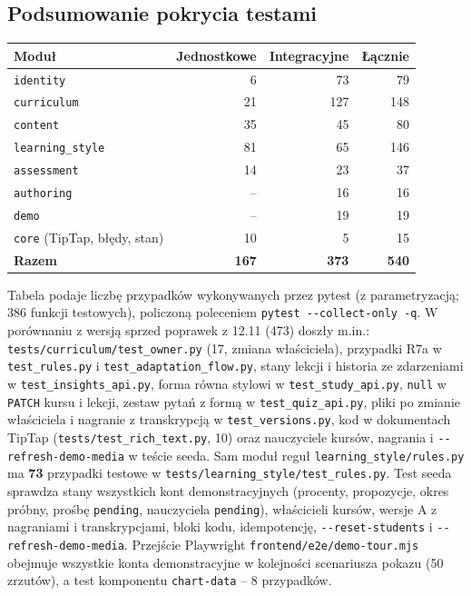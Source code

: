 \subsection{Podsumowanie pokrycia testami}

\begin{center}
\begin{tabular}{lrrr}
\toprule
\textbf{Moduł} & \textbf{Jednostkowe} & \textbf{Integracyjne} & \textbf{Łącznie} \\
\midrule
\texttt{identity}        & 6   & 73  & 79 \\
\texttt{curriculum}      & 21  & 127 & 148 \\
\texttt{content}         & 35  & 45  & 80 \\
\texttt{learning\_style} & 81  & 65  & 146 \\
\texttt{assessment}      & 14  & 23  & 37 \\
\texttt{authoring}       & --  & 16  & 16 \\
\texttt{demo}            & --  & 19  & 19 \\
\texttt{core} (TipTap, błędy, stan) & 10 & 5 & 15 \\
\midrule
\textbf{Razem}           & \textbf{167} & \textbf{373} & \textbf{540} \\
\bottomrule
\end{tabular}
\end{center}

Tabela podaje liczbę przypadków wykonywanych przez pytest (z parametryzacją; 386 funkcji testowych), policzoną poleceniem \texttt{pytest -{}-collect-only -q}. W porównaniu z wersją sprzed poprawek z 12.11 (473) doszły m.in.: \nolinkurl{tests/curriculum/test_owner.py} (17, zmiana właściciela), przypadki R7a w \nolinkurl{test_rules.py} i \nolinkurl{test_adaptation_flow.py}, stany lekcji i historia ze zdarzeniami w \nolinkurl{test_insights_api.py}, forma równa stylowi w \nolinkurl{test_study_api.py}, \texttt{null} w \texttt{PATCH} kursu i lekcji, zestaw pytań z formą w \nolinkurl{test_quiz_api.py}, pliki po zmianie właściciela i nagranie z transkrypcją w \nolinkurl{test_versions.py}, kod w dokumentach TipTap (\nolinkurl{tests/test_rich_text.py}, 10) oraz nauczyciele kursów, nagrania i \texttt{-{}-refresh-demo-media} w teście seeda. Sam moduł reguł \nolinkurl{learning_style/rules.py} ma \textbf{73} przypadki testowe w \nolinkurl{tests/learning_style/test_rules.py}. Test seeda sprawdza stany wszystkich kont demonstracyjnych (procenty, propozycje, okres próbny, prośbę \texttt{pending}, nauczyciela \texttt{pending}), właścicieli kursów, wersje A z nagraniami i transkrypcjami, bloki kodu, idempotencję, \texttt{-{}-reset-students} i \texttt{-{}-refresh-demo-media}. Przejście Playwright \nolinkurl{frontend/e2e/demo-tour.mjs} obejmuje wszystkie konta demonstracyjne w kolejności scenariusza pokazu (50 zrzutów), a test komponentu \texttt{chart-data} -- 8 przypadków.
